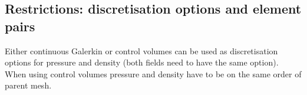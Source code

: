 \subsection{Restrictions: discretisation options and element pairs}
Either continuous Galerkin or control volumes can be used as discretisation options for pressure and density (both fields need to have the same option). When using control volumes pressure and density have to be on the same order of parent mesh.

